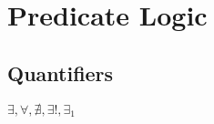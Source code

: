 











\section{Predicate Logic}



\subsection{Quantifiers}

$\exists, \forall, \nexists, \exists!, \exists_1$




